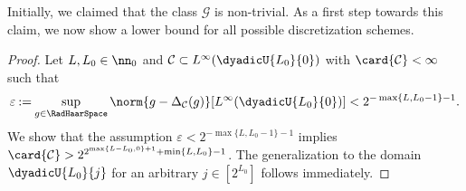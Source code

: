 \documentclass[twoside,11pt]{article}
\newcommand{\defeq}{\mathbin{:=}}
\newcommand{\set}[1]{\ensuremath{\mathcal{#1}}}
\begin{document}
Initially, we claimed that the class $\set{G}$ is non-trivial.
As a first step towards this claim, we now show a lower bound for all possible discretization schemes.


\begin{proof}
    Let $L,L_0\in\nn_0$ and $\set{C}\subset L^\infty(\dyadicU{L_0}{0})$ with $\card{\set{C}}<\infty$ such that
    \begin{align}
    \varepsilon\defeq \sup_{g\in\RadHaarSpace}\norm{g-\Delta_\set{C}(g)}[{L^\infty(\dyadicU{L_0}{0})}]< 2^{-\max\{L,L_0-1\}-1}.
    \end{align}
    We show that the assumption $\varepsilon<2^{-\max\{L,L_0-1\}-1}$ implies $\card{\set{C}}>2^{2^{\max\{L-L_0,0\}+1}+\min\{L,L_0\}-1}$.
    The generalization to the domain $\dyadicU{L_0}{j}$ for an arbitrary $j\in[2^{L_0}]$ follows immediately.


\end{proof}
\end{document}
